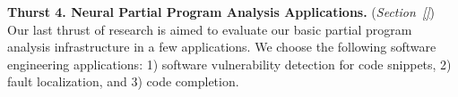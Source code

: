 \vspace{3pt}
\noindent \textbf{Thurst 4. Neural Partial Program Analysis
  Applications.}  ({\em Section~\ref{}}) Our last thrust of research
is aimed to evaluate our basic partial program analysis infrastructure
in a few applications. We choose the following software engineering
applications: 1) software vulnerability detection for code snippets,
2) fault localization, and 3) code completion.





